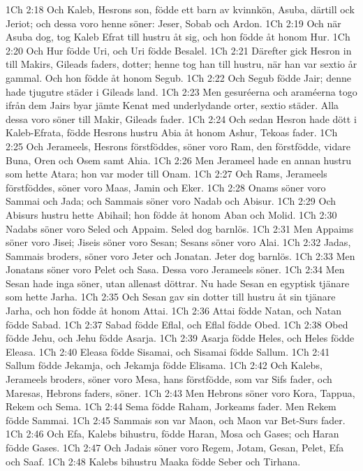 1Ch 2:18  Och Kaleb, Hesrons son, födde ett barn av kvinnkön, Asuba, därtill ock Jeriot; och dessa voro henne söner: Jeser, Sobab och Ardon.
1Ch 2:19  Och när Asuba dog, tog Kaleb Efrat till hustru åt sig, och hon födde åt honom Hur.
1Ch 2:20  Och Hur födde Uri, och Uri födde Besalel.
1Ch 2:21  Därefter gick Hesron in till Makirs, Gileads faders, dotter; henne tog han till hustru, när han var sextio år gammal. Och hon födde åt honom Segub.
1Ch 2:22  Och Segub födde Jair; denne hade tjugutre städer i Gileads land.
1Ch 2:23  Men gesuréerna och araméerna togo ifrån dem Jairs byar jämte Kenat med underlydande orter, sextio städer. Alla dessa voro söner till Makir, Gileads fader.
1Ch 2:24  Och sedan Hesron hade dött i Kaleb-Efrata, födde Hesrons hustru Abia åt honom Ashur, Tekoas fader.
1Ch 2:25  Och Jerameels, Hesrons förstföddes, söner voro Ram, den förstfödde, vidare Buna, Oren och Osem samt Ahia.
1Ch 2:26  Men Jerameel hade en annan hustru som hette Atara; hon var moder till Onam.
1Ch 2:27  Och Rams, Jerameels förstföddes, söner voro Maas, Jamin och Eker.
1Ch 2:28  Onams söner voro Sammai och Jada; och Sammais söner voro Nadab och Abisur.
1Ch 2:29  Och Abisurs hustru hette Abihail; hon födde åt honom Aban och Molid.
1Ch 2:30  Nadabs söner voro Seled och Appaim. Seled dog barnlös.
1Ch 2:31  Men Appaims söner voro Jisei; Jiseis söner voro Sesan; Sesans söner voro Alai.
1Ch 2:32  Jadas, Sammais broders, söner voro Jeter och Jonatan. Jeter dog barnlös.
1Ch 2:33  Men Jonatans söner voro Pelet och Sasa. Dessa voro Jerameels söner.
1Ch 2:34  Men Sesan hade inga söner, utan allenast döttrar. Nu hade Sesan en egyptisk tjänare som hette Jarha.
1Ch 2:35  Och Sesan gav sin dotter till hustru åt sin tjänare Jarha, och hon födde åt honom Attai.
1Ch 2:36  Attai födde Natan, och Natan födde Sabad.
1Ch 2:37  Sabad födde Eflal, och Eflal födde Obed.
1Ch 2:38  Obed födde Jehu, och Jehu födde Asarja.
1Ch 2:39  Asarja födde Heles, och Heles födde Eleasa.
1Ch 2:40  Eleasa födde Sisamai, och Sisamai födde Sallum.
1Ch 2:41  Sallum födde Jekamja, och Jekamja födde Elisama.
1Ch 2:42  Och Kalebs, Jerameels broders, söner voro Mesa, hans förstfödde, som var Sifs fader, och Maresas, Hebrons faders, söner.
1Ch 2:43  Men Hebrons söner voro Kora, Tappua, Rekem och Sema.
1Ch 2:44  Sema födde Raham, Jorkeams fader. Men Rekem födde Sammai.
1Ch 2:45  Sammais son var Maon, och Maon var Bet-Surs fader.
1Ch 2:46  Och Efa, Kalebs bihustru, födde Haran, Mosa och Gases; och Haran födde Gases.
1Ch 2:47  Och Jadais söner voro Regem, Jotam, Gesan, Pelet, Efa och Saaf.
1Ch 2:48  Kalebs bihustru Maaka födde Seber och Tirhana.
